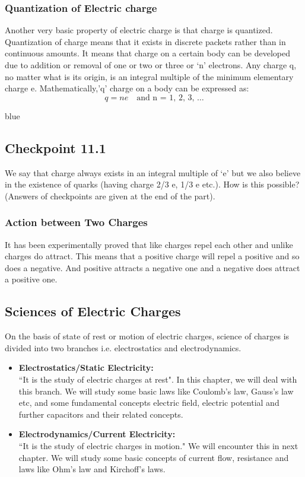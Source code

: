 \subsubsection{Quantization of Electric charge}
Another very basic property of electric charge is that charge is quantized. Quantization of charge means that it exists in discrete packets rather than in continuous amounts. It means that charge on a certain body can be developed due to addition or removal of one or two or three or ‘n’ electrons. Any charge q, no matter what is its origin, is an integral multiple of the 
minimum elementary charge e. Mathematically,'q' charge on a body can be expressed as:
\begin{equation*}
  q=ne \quad \textrm{and n = 1, 2, 3, …}
\end{equation*}
\begin{mybox}{blue}{}
\subsection*{Checkpoint 11.1}
We say that charge always exists in an integral multiple of ‘e’ but we also believe in the existence of quarks 
(having charge 2/3 e, 1/3 e etc.). How is this possible?
(Answers of checkpoints are given at the end of the part).
\end{mybox}
\subsubsection{Action between Two Charges}
It has been experimentally proved that like 
charges repel each other and unlike charges do attract. This means 
that a positive charge will repel a positive and so does a negative. And positive 
attracts a negative one and a negative does attract a positive one.

\subsection*{Sciences of Electric Charges}
On the basis of state of rest or motion of electric charges, science 
of charges is divided into two branches i.e. electrostatics and 
electrodynamics.
\begin{itemize}
\item{\textbf{Electrostatics/Static Electricity:}}\\
``It is the study of electric charges at rest". 
In this chapter, we will deal with this branch. We will 
study some basic laws like Coulomb’s law, Gauss’s law etc, and 
some fundamental concepts electric field, electric potential 
and further capacitors and their related concepts.
\item{\textbf{Electrodynamics/Current Electricity:}}\\
``It is the study of electric charges in motion." We will encounter 
this in next chapter. We will study some basic concepts of current 
flow, resistance and laws like Ohm’s law and Kirchoff’s laws.
\end{itemize}

